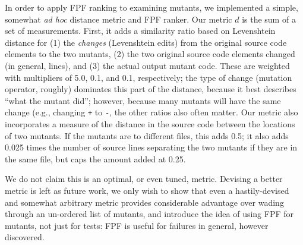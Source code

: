 In order to apply FPF ranking to examining mutants, we implemented a
simple, somewhat \emph{ad hoc} distance metric and FPF ranker.  Our metric $d$ is
the sum of a set of measurements.  First, it adds a similarity
ratio based on Levenshtein distance \cite{lev} for (1) the \emph{changes} (Levenshtein edits) from
the original source code elements to
the two mutants,  (2) the two original source code elements changed (in
general, lines), and (3) the actual output mutant code.  These are
weighted with multipliers of 5.0, 0.1, and 0.1, respectively; the type
of change (mutation operator, roughly) dominates this part of the
distance, because it best describes ``what the mutant did''; however,
because many mutants will have the same change (e.g., changing {\tt +}
to {\tt -}, the other ratios also often matter.
Our metric also incorporates a measure of the distance in the source
code between the locations of two mutants.  If the mutants are to
different files, this adds 0.5; it also adds 0.025
times the number of source lines separating the two mutants if they
are in the same file, but caps the amount added at
0.25.  

We do not claim this is an optimal, or even tuned, metric. Devising a better metric is left as future work, we only wish to show 
that even a hastily-devised and somewhat arbitrary metric provides 
considerable advantage over wading through an un-ordered list of 
mutants, and introduce the idea of using FPF for mutants, not just for tests: FPF is useful for failures in general, however discovered.

